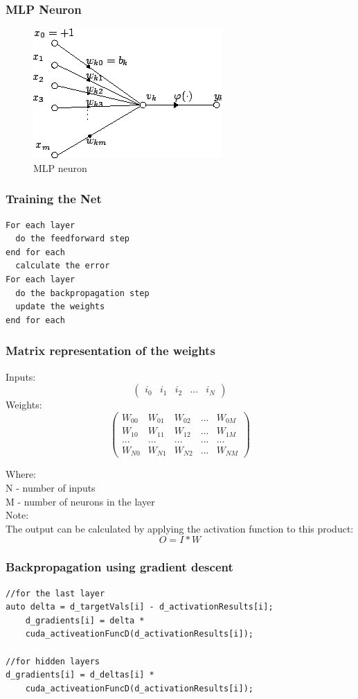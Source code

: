 \documentclass{beamer}
\begin{document}
\begin{frame}
\frametitle{MLP Neuron}
\begin{figure}
\centering
\includegraphics[scale=0.5]{neuron.png}
\caption{MLP neuron}
\end{figure} 
\end{frame}

\begin{frame}[fragile]
\frametitle{Training the Net}
\begin{verbatim}
For each layer
  do the feedforward step
end for each
  calculate the error
For each layer
  do the backpropagation step
  update the weights
end for each
\end{verbatim}
\end{frame}

\begin{frame}
\frametitle{Matrix representation of the weights}
Inputs:
\[ \left( \begin{array}{ccccc}
i_{0} & i_{1} & i_{2} & ... & i_{N} \end{array} \right)\] 
Weights:
\[ \left( \begin{array}{ccccc}
W_{00} & W_{01} & W_{02} & ... & W_{0M} \\
W_{10} & W_{11} & W_{12} & ... & W_{1M} \\
... & ... & ... & ... & ... \\
W_{N0} & W_{N1} & W_{N2} & ... & W_{NM} \end{array} \right)\] 

Where: \\
N - number of inputs \\
M - number of neurons in the layer \\
Note: \\
The output can be calculated by applying the activation function to this product: \\
\[O = I * W\]

\end{frame}

\begin{frame}[fragile]
\frametitle{Backpropagation using gradient descent}
\begin{verbatim}
//for the last layer
auto delta = d_targetVals[i] - d_activationResults[i];
	d_gradients[i] = delta * 
	cuda_activeationFuncD(d_activationResults[i]);

//for hidden layers
d_gradients[i] = d_deltas[i] * 
	cuda_activeationFuncD(d_activationResults[i]);
\end{verbatim}
\end{frame}
\end{document}
